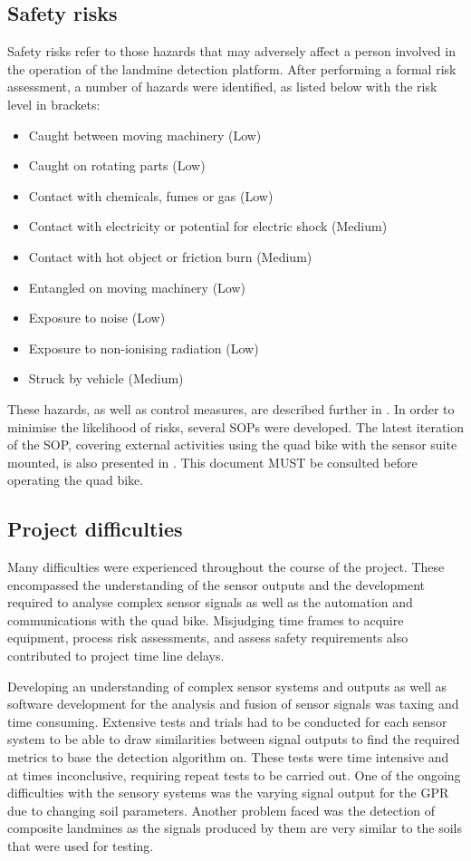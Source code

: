\documentclass[main.tex]{subfiles}
\begin{document}
\subsection{Safety risks}
Safety risks refer to those hazards that may adversely affect a person involved in the operation of the landmine detection platform. After performing a formal risk assessment, a number of hazards were identified, as listed below with the risk level in brackets:
\begin{itemize}
\item Caught between moving machinery (Low)
\item Caught on rotating parts (Low)
\item Contact with chemicals, fumes or gas (Low)
\item Contact with electricity or potential for electric shock (Medium)
\item Contact with hot object or friction burn (Medium)
\item Entangled on moving machinery (Low)
\item Exposure to noise (Low)
\item Exposure to non-ionising radiation (Low)
\item Struck by vehicle (Medium)
\end{itemize}
These hazards, as well as control measures, are described further in . In order to minimise the likelihood of risks, several SOPs were developed. The latest iteration of the SOP, covering external activities using the quad bike with the sensor suite mounted, is also presented in . This document MUST be consulted before operating the quad bike. 
% 

\subsection{Project difficulties}%
Many difficulties were experienced throughout the course of the project. These encompassed the understanding of the sensor outputs and the development required to analyse complex sensor signals as well as the automation and communications with the quad bike. Misjudging time frames to acquire equipment, process risk assessments, and assess safety requirements also contributed to project time line delays.

Developing an understanding of complex sensor systems and outputs as well as software development for the analysis and fusion of sensor signals was taxing and time consuming. Extensive tests and trials had to be conducted for each sensor system to be able to draw similarities between signal outputs to find the required metrics to base the detection algorithm on. These tests were time intensive and at times inconclusive, requiring repeat tests to be carried out. One of the ongoing difficulties with the sensory systems was the varying signal output for the GPR due to changing soil parameters. Another problem faced was the detection of composite landmines as the signals produced by them are very similar to the soils that were used for testing. 
\end{document}
